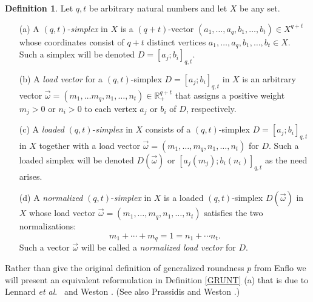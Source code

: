 \documentclass[10pt]{amsart}
\theoremstyle{definition}
\newtheorem{defn}[thm]{Definition}
\theoremstyle{remark}
\begin{document}
\begin{defn}\label{CUTIE}
Let $q,t$ be arbitrary natural numbers and let $X$ be any set.
\begin{enumerate}
\item[(a)] A $(q,t)$-\textit{simplex} in $X$ is a $(q+t)$-vector $(a_{1}, \ldots , a_{q}, b_{1}, \ldots ,b_{t}) \in X^{q+t}$
whose coordinates consist of $q+t$ distinct vertices $a_{1}, \ldots, a_{q}, b_{1}, \ldots , b_{t} \in X$. Such a
simplex will be denoted $D=[a_{j};b_{i}]_{q,t}$.

\item[(b)] A \textit{load vector} for a $(q,t)$-simplex $D=[a_{j};b_{i}]_{q,t}$ in $X$ is an arbitrary vector
$\vec{\omega} = (m_{1}, \ldots m_{q}, n_{1}, \ldots , n_{t}) \in \mathbb{R}^{q+t}_{+}$ that assigns a positive weight
$m_{j} > 0$ or $n_{i} > 0$ to each vertex $a_{j}$ or $b_{i}$ of $D$, respectively.

\item[(c)] A \textit{loaded} $(q,t)$-\textit{simplex} in $X$ consists of a $(q,t)$-simplex $D=[a_{j};b_{i}]_{q,t}$ in $X$
together with a load vector $\vec{\omega} =(m_{1}, \ldots ,m_{q}, n_{1}, \ldots, n_{t})$ for $D$. Such a loaded simplex
will be denoted $D(\vec{\omega})$ or $[a_{j}(m_{j});b_{i}(n_{i})]_{q,t}$ as the need arises.

\item[(d)] A \textit{normalized} $(q,t)$-\textit{simplex} in $X$ is a loaded $(q,t)$-simplex $D(\vec{\omega})$ in $X$ whose
load vector $\vec{\omega}=(m_{1}, \ldots , m_{q}, n_{1}, \ldots , n_{t})$ satisfies the two normalizations:
\[
m_{1} + \cdots + m_{q} = 1 = n_{1} + \cdots n_{t}.
\]
Such a vector $\vec{\omega}$ will be called a \textit{normalized load vector} for $D$.
\end{enumerate}
\end{defn}
\noindent Rather than give the original definition of generalized roundness $p$ from Enflo \cite{E} we will
present an equivalent reformulation in Definition \ref{GRUNT} (a) that is due to Lennard \textit{et al}.\
\cite{LTW} and Weston \cite{W}. (See also Prassidis and Weston \cite{PW}.)
\end{document}

